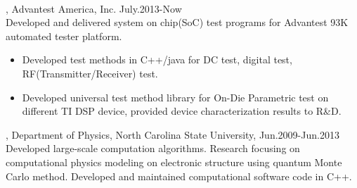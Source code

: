 \documentclass[11pt]{article} %
\begin{document}
\\
, Advantest America, Inc. July.2013-Now\\
\noindent Developed and delivered system on chip(SoC) test programs for Advantest 93K automated tester platform.\\ 
\begin{itemize}
    \item Developed test methods in C++/java for DC test, digital test, RF(Transmitter/Receiver) test.\\
 \vspace{-4mm}
    \item  Developed universal test method library for On-Die Parametric test on different TI DSP device, provided device characterization results to R\&D.\\ 
\vspace{-4mm}
 \end{itemize}
\vspace{1mm}
, Department of Physics, North Carolina State University, Jun.2009-Jun.2013\\
\noindent Developed large-scale computation algorithms. Research focusing on computational physics modeling on electronic structure using quantum Monte Carlo method. Developed and maintained computational software code in C++.\\
\end{document}
